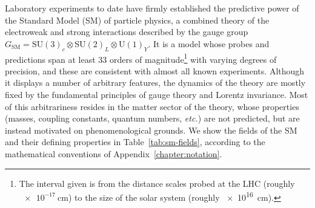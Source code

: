 Laboratory experiments to date have firmly established the predictive power of
the Standard Model (SM) of particle physics, a combined theory of the
electroweak and strong interactions described by the gauge group
$G_{\text{SM}} = \mathrm{SU}(3)_{c} \otimes \mathrm{SU}(2)_{L} \otimes \mathrm{U}(1)_{Y}$.
It is a model whose probes and predictions span at least 33 orders of
magnitude\footnote{The interval given is from the distance scales probed at the
  LHC (roughly $\SI{e-17}{\cm}$) to the size of the solar system (roughly
  \SI{e16}{\cm}).} with varying degrees of precision, and these are consistent
with almost all known experiments. Although it displays a number of arbitrary
features, the dynamics of the theory are mostly fixed by the fundamental
principles of gauge theory and Lorentz invariance. Most of this arbitrariness
resides in the matter sector of the theory, whose properties (masses, coupling
constants, quantum numbers, \textit{etc.}) are not predicted, but are instead
motivated on phenomenological grounds. We show the fields of the SM and their
defining properties in Table~\ref{tab:sm-fields}, according to the mathematical
conventions of Appendix~\ref{chapter:notation}.
